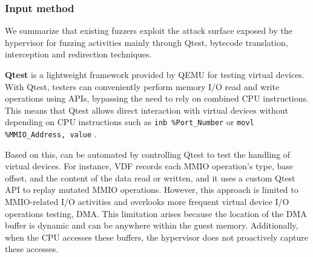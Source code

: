 
\subsubsection{Input method}
We summarize that existing fuzzers exploit the attack surface exposed by the hypervisor for fuzzing activities mainly through Qtest, bytecode translation, interception and redirection techniques.

\textbf{Qtest} is a lightweight framework provided by QEMU for testing virtual devices. With Qtest, testers can conveniently perform memory I/O read and write operations using APIs, bypassing the need to rely on combined CPU instructions. This means that Qtest allows direct interaction with virtual devices without depending on CPU instructions such as \texttt{inb \%Port\_Number} or \texttt{movl \%MMIO\_Address, value} \cite{bulekov2022morphuzz}. 

Based on this,  can be automated by controlling Qtest to test the handling of virtual devices. For instance, VDF \cite{henderson2017vdf} records each MMIO operation's type, base offset, and the content of the data read or written, and it uses a custom Qtest API to replay mutated MMIO operations. However, this approach is limited to MMIO-related I/O activities and overlooks more frequent virtual device I/O operations testing, \ie DMA. This limitation arises because the location of the DMA buffer is dynamic and can be anywhere within the guest memory. Additionally, when the CPU accesses these buffers, the hypervisor does not proactively capture these accesses. 

